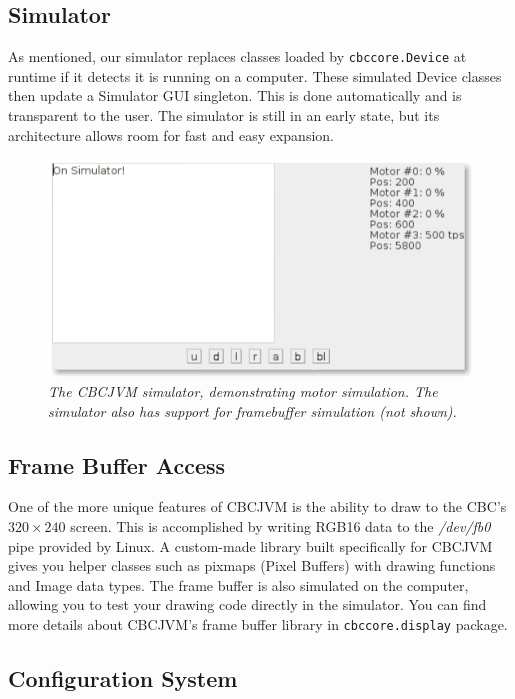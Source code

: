 \documentclass[10pt,letterpaper]{article}
\begin{document}
\subsection{Simulator}

As mentioned, our simulator replaces classes loaded by \texttt{cbccore.Device} at runtime if it detects it is running on a computer. These simulated Device classes then update a Simulator GUI singleton. This is done automatically and is transparent to the user. The simulator is still in an early state, but its architecture allows room for fast and easy expansion.

\begin{figure}[h]
\includegraphics[width=\textwidth]{simulator.png}
\caption{\textit{The CBCJVM simulator, demonstrating motor simulation. The simulator also has support for framebuffer simulation (not shown).}}
\end{figure}


\subsection{Frame Buffer Access}

One of the more unique features of CBCJVM is the ability to draw to the CBC's $320 \times 240$ screen. This is accomplished by writing RGB16 data to the \textsl{/dev/fb0} pipe provided by Linux. A custom-made library built specifically for CBCJVM gives you helper classes such as pixmaps (Pixel Buffers) with drawing functions and Image data types. The frame buffer is also simulated on the computer, allowing you to test your drawing code directly in the simulator. You can find more details about CBCJVM's frame buffer library in \texttt{cbccore.display} package.



\subsection{Configuration System}
\end{document}
